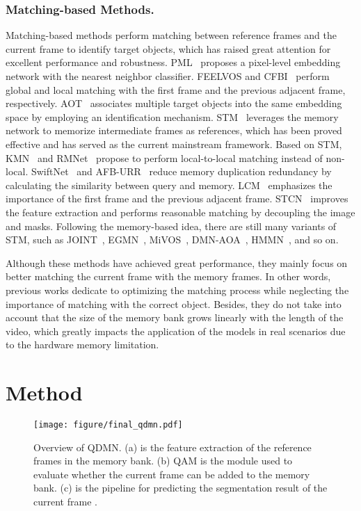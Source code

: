 \documentclass[runningheads]{llncs}
\begin{document}
    \subsubsection{Matching-based Methods.} 
    Matching-based methods perform matching between reference frames and the current frame to identify target objects, which has raised great attention for excellent performance and robustness.
    PML~\cite{pml} proposes a pixel-level embedding network with the nearest neighbor classifier.
FEELVOS \cite{feelvos} and CFBI~\cite{cfbi} perform global and local matching with the first frame and the previous adjacent frame, respectively.
AOT~\cite{aot} associates multiple target objects into the same embedding space by employing an identification mechanism.
    STM~\cite{stm} leverages the memory network to memorize intermediate frames as references, which has been proved effective and has served as the current mainstream framework. 
    Based on STM, KMN~\cite{kmn} and RMNet~\cite{rmnet} propose to perform local-to-local matching instead of non-local.
    SwiftNet~\cite{swiftnet} and AFB-URR~\cite{afb-urr} reduce memory duplication redundancy by calculating the similarity between query and memory.
    LCM~\cite{lcm} emphasizes the importance of the first frame and the previous adjacent frame.
    STCN~\cite{stcn} improves the feature extraction and performs reasonable matching by decoupling the image and masks.
Following the memory-based idea, there are still many variants of STM, such as JOINT~\cite{joint}, EGMN~\cite{egmn}, MiVOS~\cite{mivos}, DMN-AOA~\cite{alignment}, HMMN~\cite{hmm}, and so on.
    
    Although these methods have achieved great performance, they mainly focus on better matching the current frame with the memory frames.
    In other words, previous works dedicate to optimizing the matching process while neglecting the importance of matching with the correct object.
    Besides, they do not take into account that the size of the memory bank grows linearly with the length of the video, which greatly impacts the application of the models in real scenarios due to the hardware memory limitation.
 \section{Method}

\begin{figure*}[t]
    \centering
    \texttt{[image: figure/final\_qdmn.pdf]}
    \caption{Overview of QDMN. (a) is the feature extraction of the reference frames in the memory bank. (b) QAM is the module used to evaluate whether the current frame can be added to the memory bank. (c)
    is the pipeline for predicting the segmentation result of the current frame  .
    }
    \label{framework}
\end{figure*}
\end{document}
